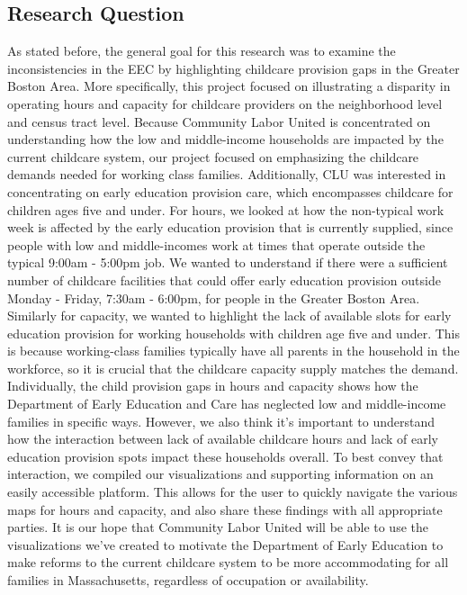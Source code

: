 \documentclass[man]{apa6}
\begin{document}
\subsection{Research Question}\label{research-question}

As stated before, the general goal for this research was to examine the
inconsistencies in the EEC by highlighting childcare provision gaps in
the Greater Boston Area. More specifically, this project focused on
illustrating a disparity in operating hours and capacity for childcare
providers on the neighborhood level and census tract level. Because
Community Labor United is concentrated on understanding how the low and
middle-income households are impacted by the current childcare system,
our project focused on emphasizing the childcare demands needed for
working class families. Additionally, CLU was interested in
concentrating on early education provision care, which encompasses
childcare for children ages five and under. For hours, we looked at how
the non-typical work week is affected by the early education provision
that is currently supplied, since people with low and middle-incomes
work at times that operate outside the typical 9:00am - 5:00pm job. We
wanted to understand if there were a sufficient number of childcare
facilities that could offer early education provision outside Monday -
Friday, 7:30am - 6:00pm, for people in the Greater Boston Area.
Similarly for capacity, we wanted to highlight the lack of available
slots for early education provision for working households with children
age five and under. This is because working-class families typically
have all parents in the household in the workforce, so it is crucial
that the childcare capacity supply matches the demand.\\
Individually, the child provision gaps in hours and capacity shows how
the Department of Early Education and Care has neglected low and
middle-income families in specific ways. However, we also think it's
important to understand how the interaction between lack of available
childcare hours and lack of early education provision spots impact these
households overall. To best convey that interaction, we compiled our
visualizations and supporting information on an easily accessible
platform. This allows for the user to quickly navigate the various maps
for hours and capacity, and also share these findings with all
appropriate parties. It is our hope that Community Labor United will be
able to use the visualizations we've created to motivate the Department
of Early Education to make reforms to the current childcare system to be
more accommodating for all families in Massachusetts, regardless of
occupation or availability.
\end{document}
